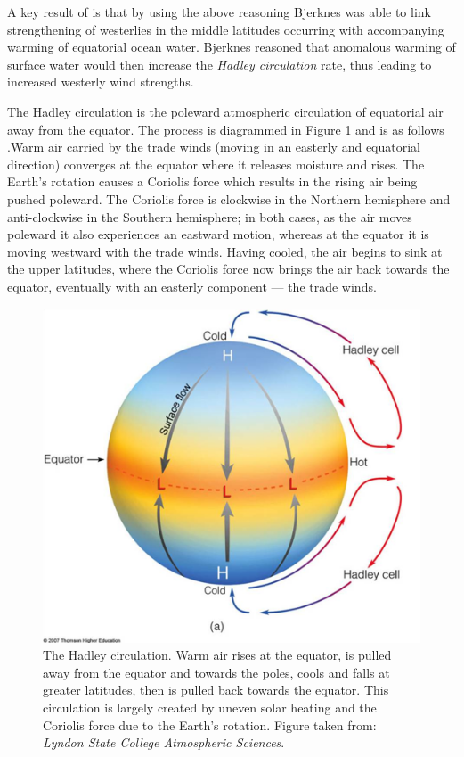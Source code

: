 A key result of \cite{bjerknes1966} is that by using the above reasoning
Bjerknes was able to link strengthening of westerlies in the middle latitudes
occurring with accompanying warming of equatorial ocean water. Bjerknes reasoned
that anomalous warming of surface water would then increase the \emph{Hadley
  circulation} rate, thus leading to increased westerly wind strengths.

The Hadley circulation is the poleward atmospheric circulation of
equatorial air away from the equator. The process is diagrammed in Figure
\ref{fig:hadleycell} and is as follows \citep{geomar6557}.Warm air carried by
the trade winds (moving in an easterly and equatorial direction) converges at
the equator where it releases moisture and rises. The Earth's rotation causes a
Coriolis force which results in the rising air being pushed poleward. The
Coriolis force is clockwise in the Northern hemisphere and anti-clockwise in the
Southern hemisphere; in both cases, as the air moves poleward it also
experiences an eastward motion, whereas at the equator it is moving westward
with the trade winds. Having cooled, the air begins to sink at the upper
latitudes, where the Coriolis force now brings the air back towards the equator,
eventually with an easterly component --- the trade winds.

\begin{figure}[t]
  \centering \includegraphics[width=0.9\linewidth]{figures/hadleycell.png}
  \caption{The Hadley circulation. Warm air rises at the equator, is pulled away
    from the equator and towards the poles, cools and falls at greater
    latitudes, then is pulled back towards the equator. This circulation is
    largely created by uneven solar heating and the Coriolis force due to the
    Earth's rotation. Figure taken from: \emph{Lyndon State College Atmospheric
      Sciences}.}
  \label{fig:hadleycell}
\end{figure}

